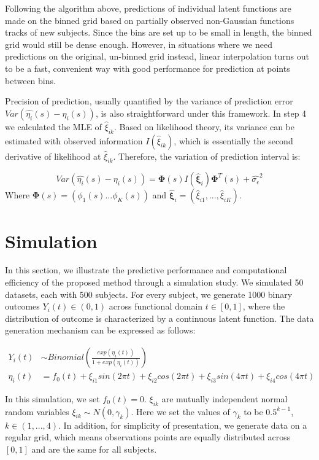 \documentclass[
  11pt,
]{article}
\begin{document}
Following the algorithm above, predictions of individual latent
functions are made on the binned grid based on partially observed
non-Gaussian functions tracks of new subjects. Since the bins are set up
to be small in length, the binned grid would still be dense enough.
However, in situations where we need predictions on the original,
un-binned grid instead, linear interpolation turns out to be a fast,
convenient way with good performance for prediction at points between
bins.

Precision of prediction, usually quantified by the variance of
prediction error \(Var(\hat{\eta_i}(s)-\eta_i(s))\), is also
straightforward under this framework. In step 4 we calculated the MLE of
\(\hat{\xi}_{ik}\). Based on likelihood theory, its variance can be
estimated with observed information \({I}(\hat{\xi}_{ik})\), which is
essentially the second derivative of likelihood at \(\hat{\xi}_{ik}\).
Therefore, the variation of prediction interval is:

\[Var(\hat{\eta_i}(s)-\eta_i(s))=\boldsymbol{\Phi}(s)I(\hat{\boldsymbol{\xi}}_i)\boldsymbol{\Phi}^T(s)+\hat{\sigma_{\epsilon}}^2\]
Where \(\boldsymbol{\Phi}(s)=(\phi_1(s)...\phi_K(s))\) and
\(\hat{\boldsymbol{\xi}}_i=(\hat{\xi}_{i1}, ...,\hat{\xi}_{iK})\).

\hypertarget{simulation}{%
\section{Simulation}\label{simulation}}

In this section, we illustrate the predictive performance and
computational efficiency of the proposed method through a simulation
study. We simulated 50 datasets, each with 500 subjects. For every
subject, we generate 1000 binary outcomes \(Y_i(t) \in (0, 1)\) across
functional domain \(t \in [0, 1]\), where the distribution of outcome is
characterized by a continuous latent function. The data generation
mechanism can be expressed as follows:

\[\begin{aligned}
Y_i(t) & \sim Binomial(\frac{exp(\eta_i(t))}{1+exp(\eta_i(t))}) \\
\eta_i(t) &= f_0(t)+ \xi_{i1}sin(2\pi t)+\xi_{i2}cos(2\pi t)+\xi_{i3}sin(4\pi t)+\xi_{i4}cos(4\pi t)
\end{aligned}\]

In this simulation, we set \(f_0(t) = 0\). \(\xi_{ik}\) are mutually
independent normal random variables \(\xi_{ik}\sim N(0, \gamma_k)\).
Here we set the values of \(\gamma_k\) to be \(0.5^{k-1}\),
\(k \in (1,..., 4)\). In addition, for simplicity of presentation, we
generate data on a regular grid, which means observations points are
equally distributed across \([0, 1]\) and are the same for all subjects.
\end{document}
